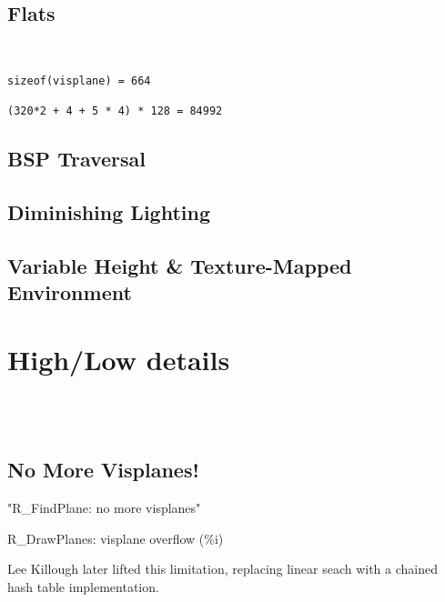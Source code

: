 
\subsection{Flats}
\\
\par
\begin{verbatim}
sizeof(visplane) = 664

(320*2 + 4 + 5 * 4) * 128 = 84992
\end{verbatim}

\subsection{BSP Traversal}

\subsection{Diminishing Lighting}

\subsection{Variable Height \& Texture-Mapped Environment}

\section{High/Low details}

\\
\\


\subsection{No More Visplanes!}
"R\_FindPlane: no more visplanes"\\
\par
R\_DrawPlanes: visplane overflow (\%i)\\
\par

Lee Killough later lifted this limitation, replacing linear seach with a chained hash table implementation.